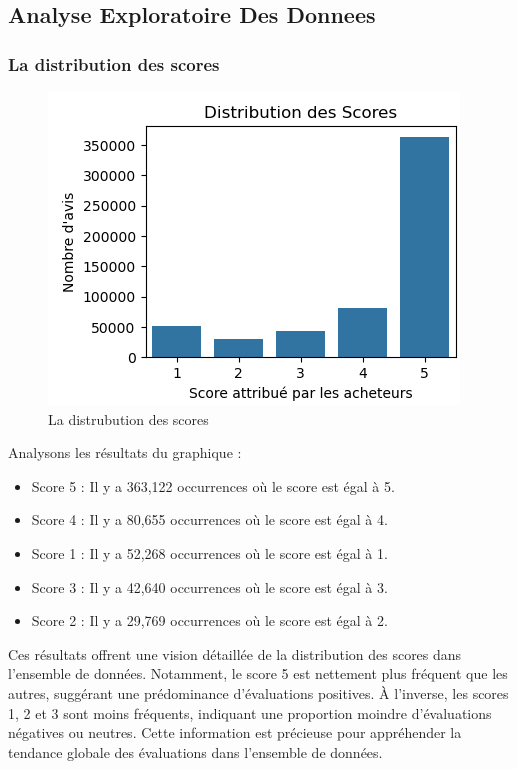 
\subsection{Analyse Exploratoire Des Donnees}
\subsubsection{La distribution des scores}
\begin{figure}[h]
    \centering
    \includegraphics[scale=0.8]{assets/distrubutiondesscores.PNG}
    \caption{La distrubution des scores}
    \label{fig:distrubution_des_scores}
\end{figure}

Analysons les résultats du graphique :

\begin{itemize}
    \item Score 5 : Il y a 363,122 occurrences où le score est égal à 5.
    \item Score 4 : Il y a 80,655 occurrences où le score est égal à 4.
    \item Score 1 : Il y a 52,268 occurrences où le score est égal à 1.
    \item Score 3 : Il y a 42,640 occurrences où le score est égal à 3.
    \item Score 2 : Il y a 29,769 occurrences où le score est égal à 2.
\end{itemize}

Ces résultats offrent une vision détaillée de la distribution des scores dans l'ensemble de données. Notamment, le score 5 est nettement plus fréquent que les autres, suggérant une prédominance d'évaluations positives. À l'inverse, les scores 1, 2 et 3 sont moins fréquents, indiquant une proportion moindre d'évaluations négatives ou neutres. Cette information est précieuse pour appréhender la tendance globale des évaluations dans l'ensemble de données.

